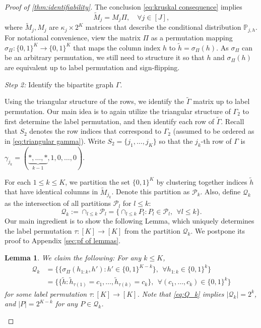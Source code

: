 \documentclass[10pt]{article} %
\newtheorem{lemma}{Lemma}
\newcommand{\PP}{\mathbb P}
\def\tilde{\widetilde}
\begin{document}
\begin{proof}[Proof of \cref{thm:identifiability}]
    The conclusion \eqref{eq:kruskal consequence} implies
    $$\tilde{M}_j = M_j \Pi, \quad \forall j \in [J],$$
    where $\tilde{M}_j, M_j$ are $\kappa_j \times 2^K$ matrices that describe the conditional distribution $\PP_{j,h}$. For notational convenience, view the matrix $\Pi$ as a permutation mapping $\sigma_\Pi : \{0,1\}^K \to \{0,1\}^K$ that maps the column index $h$ to $\tilde{h} = \sigma_\Pi(h)$. As $\sigma_\Pi$ can be an arbitrary permutation, we still need to structure it so that $h$ and $\sigma_\Pi(h)$ are equivalent up to label permutation and sign-flipping.
    

    \emph{Step 2:} Identify the bipartite graph $\Gamma$.
    
    
    
    Using the triangular structure of the rows, we identify the $\tilde{\Gamma}$ matrix up to label permutation. Our main idea is to again utilize the triangular structure of $\Gamma_2$ to first determine the label permutation, and then identify each row of $\tilde{\Gamma}.$
    Recall that $S_2$ denotes the row indices that correspond to $\Gamma_2$ (assumed to be ordered as in \eqref{eq:triangular gamma}). Write $S_2 = \{j_1, \ldots, j_K\}$ so that the $j_k$-th row of $\Gamma$ is $\gamma_{j_k} = (\underbrace{*, \ldots, *}_{k-1}, 1, 0, \ldots, 0)$.


For each $1 \le k \le K$, we partition the set $\{0,1\}^K$ by clustering together indices $\tilde{h}$ that have identical columns in $\tilde{M}_{j_k}$. Denote this partition as $\mathcal{P}_k$. Also, define $\mathcal{Q}_k$ as the intersection of all partitions $\mathcal{P}_l$ for $l \le k$:
$$\mathcal{Q}_k := \cap_{l \le k} \mathcal{P}_l = \{\cap_{l \le k} P_l: P_l \in \mathcal{P}_l, ~~ \forall l \le k \}.$$
Our main ingredient is to show the following Lemma, which uniquely determines the label permutation $\tau:[K]\to[K]$ from the partition $\mathcal{Q}_k$. We postpone its proof to Appendix \ref{sec:pf of lemmas}.

\begin{lemma}\label{lem:identify gamma}
We claim the following: For any $k \le K$,
\begin{align}\label{eq:Q_k}
    \mathcal{Q}_k &= \{\{\sigma_\Pi(h_{1:k}, h'): h' \in \{0,1\}^{K-k}\}, ~~ \forall h_{1:k} \in \{0,1\}^k \} \\
    &=\{\{\tilde{h}: \tilde{h}_{\tau(1)} = c_1, \ldots, \tilde{h}_{\tau(k)} = c_k\}, ~~ \forall (c_1,\ldots,c_k) \in \{0,1\}^k \}
    \label{eq:Q_k alternative}
\end{align}
for some label permutation $\tau: [K] \to [K]$. Note that \eqref{eq:Q_k} implies $|\mathcal{Q}_k| = 2^k$, and $|P| = 2^{K-k}$ for any $P \in \mathcal{Q}_k$.
\end{lemma}



\end{proof}
\end{document}

